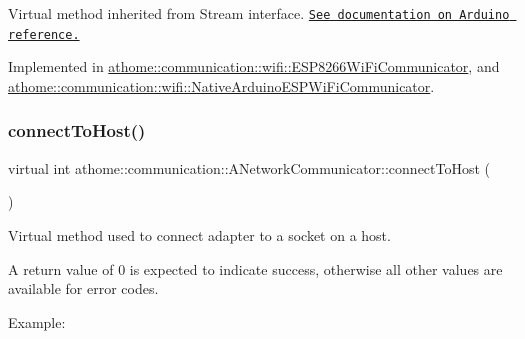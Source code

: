 Virtual method inherited from Stream interface. \href{https://www.arduino.cc/reference/en/language/functions/communication/stream/streamavailable/}{\tt See documentation on Arduino reference.} 

Implemented in \mbox{\hyperlink{classathome_1_1communication_1_1wifi_1_1_e_s_p8266_wi_fi_communicator_af9b1e28910959893748763faaa5373a0}{athome\+::communication\+::wifi\+::\+E\+S\+P8266\+Wi\+Fi\+Communicator}}, and \mbox{\hyperlink{classathome_1_1communication_1_1wifi_1_1_native_arduino_e_s_p_wi_fi_communicator_a6cd3fe64efeb1085c7e6dc71a740a24b}{athome\+::communication\+::wifi\+::\+Native\+Arduino\+E\+S\+P\+Wi\+Fi\+Communicator}}.

\mbox{\label{classathome_1_1communication_1_1_a_network_communicator_a370176dae8f38225446e83a132dbcff7}} 
\subsubsection{\texorpdfstring{connect\+To\+Host()}{connectToHost()}}
{\footnotesize\ttfamily virtual int athome\+::communication\+::\+A\+Network\+Communicator\+::connect\+To\+Host (\begin{DoxyParamCaption}{ }\end{DoxyParamCaption})\hspace{0.3cm}{\ttfamily [pure virtual]}}

Virtual method used to connect adapter to a socket on a host.

A return value of 0 is expected to indicate success, otherwise all other values are available for error codes.

Example\+:


